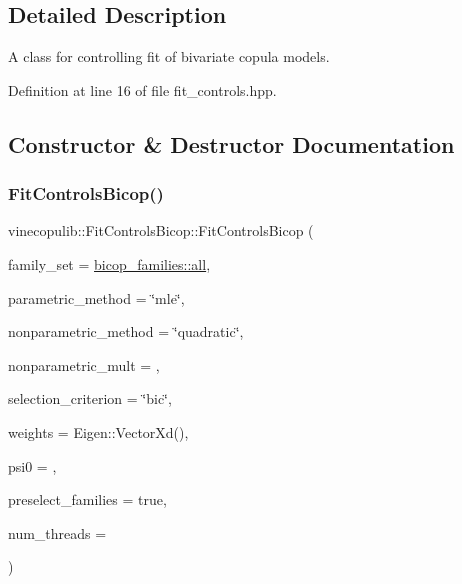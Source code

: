 \subsection{Detailed Description}
A class for controlling fit of bivariate copula models. 

Definition at line 16 of file fit\+\_\+controls.\+hpp.



\subsection{Constructor \& Destructor Documentation}
\mbox{\label{classvinecopulib_1_1_fit_controls_bicop_a20f51de5d89278679c2c9aa2bac2a36e}} 
\subsubsection{\texorpdfstring{Fit\+Controls\+Bicop()}{FitControlsBicop()}\hspace{0.1cm}{\footnotesize\ttfamily [1/3]}}
{\footnotesize\ttfamily vinecopulib\+::\+Fit\+Controls\+Bicop\+::\+Fit\+Controls\+Bicop (\begin{DoxyParamCaption}\item[{std\+::vector$<$ \hyperlink{namespacevinecopulib_a42e95cc06d33896199caab0c11ad44f3}{Bicop\+Family} $>$}]{family\+\_\+set = {\ttfamily \hyperlink{namespacevinecopulib_1_1bicop__families_a5214a513f41ec23b74782aab96ea6774}{bicop\+\_\+families\+::all}},  }\item[{std\+::string}]{parametric\+\_\+method = {\ttfamily \char`\"{}mle\char`\"{}},  }\item[{std\+::string}]{nonparametric\+\_\+method = {\ttfamily \char`\"{}quadratic\char`\"{}},  }\item[{double}]{nonparametric\+\_\+mult = {},  }\item[{std\+::string}]{selection\+\_\+criterion = {\ttfamily \char`\"{}bic\char`\"{}},  }\item[{const Eigen\+::\+Vector\+Xd \&}]{weights = {\ttfamily Eigen\+:\+:VectorXd()},  }\item[{double}]{psi0 = {},  }\item[{bool}]{preselect\+\_\+families = {\ttfamily true},  }\item[{size\+\_\+t}]{num\+\_\+threads = {} }\end{DoxyParamCaption})\hspace{0.3cm}{\ttfamily [inline]}}



